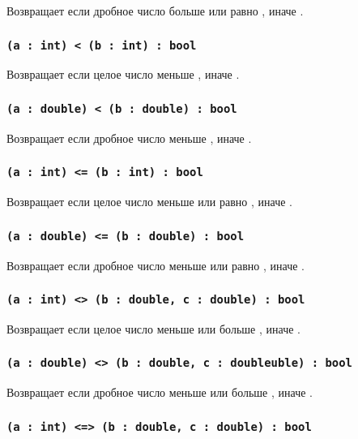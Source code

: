 Возвращает \true{} если дробное число  больше или равно , иначе \false{}.

\subsubsection{\lstinline|(a : int) < (b : int) : bool|}

Возвращает \true{} если целое число  меньше , иначе \false{}.

\subsubsection{\lstinline|(a : double) < (b : double) : bool|}

Возвращает \true{} если дробное число  меньше , иначе \false{}.

\subsubsection{\lstinline|(a : int) <= (b : int) : bool|}

Возвращает \true{} если целое число  меньше или равно , иначе \false{}.

\subsubsection{\lstinline|(a : double) <= (b : double) : bool|}

Возвращает \true{} если дробное число  меньше или равно , иначе \false{}.

\subsubsection{\lstinline|(a : int) <> (b : double, c : double) : bool|}

Возвращает \true{} если целое число  меньше  или больше , иначе \false{}.

\subsubsection{\lstinline|(a : double) <> (b : double, c : doubleuble) : bool|}

Возвращает \true{} если дробное число  меньше  или больше , иначе \false{}.

\subsubsection{\lstinline|(a : int) <=> (b : double, c : double) : bool|}

